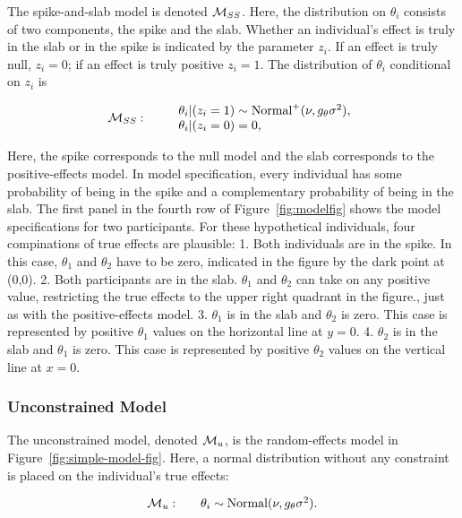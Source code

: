 \documentclass[english,man]{apa6}
\theoremstyle{definition}
\theoremstyle{definition}
\theoremstyle{remark}
\begin{document}
The spike-and-slab model is denoted \({\cal M}_{SS}\). Here, the
distribution on \(\theta_i\) consists of two components, the spike and
the slab. Whether an individual's effect is truly in the slab or in the
spike is indicated by the parameter \(z_i\). If an effect is truly null,
\(z_i = 0\); if an effect is truly positive \(z_i = 1\). The
distribution of \(\theta_i\) conditional on \(z_i\) is

\begin{align*}
{\cal M}_{SS}:
\qquad
\begin{array}{l}
\theta_i | (z_i = 1) \sim \mbox{Normal}^+(\nu, g_\theta \sigma^2),\\
\theta_i | (z_i = 0) = 0,
\end{array}
\end{align*}

Here, the spike corresponds to the null model and the slab corresponds
to the positive-effects model. In model specification, every individual
has some probability of being in the spike and a complementary
probability of being in the slab. The first panel in the fourth row of
Figure~\ref{fig:modelfig} shows the model specifications for two
participants. For these hypothetical individuals, four compinations of
true effects are plausible: 1. Both individuals are in the spike. In
this case, \(\theta_1\) and \(\theta_2\) have to be zero, indicated in
the figure by the dark point at (0,0). 2. Both participants are in the
slab. \(\theta_1\) and \(\theta_2\) can take on any positive value,
restricting the true effects to the upper right quadrant in the figure.,
just as with the positive-effects model. 3. \(\theta_1\) is in the slab
and \(\theta_2\) is zero. This case is represented by positive
\(\theta_1\) values on the horizontal line at \(y = 0\). 4. \(\theta_2\)
is in the slab and \(\theta_1\) is zero. This case is represented by
positive \(\theta_2\) values on the vertical line at \(x = 0\).

\subsubsection{Unconstrained Model}\label{unconstrained-model}

The unconstrained model, denoted \({\cal M}_u\), is the random-effects
model in Figure~\ref{fig:simple-model-fig}. Here, a normal distribution
without any constraint is placed on the individual's true effects:

\[
  \begin{array}{llr}
{\cal M}_u: && \theta_i \sim \mbox{Normal}(\nu, g_\theta \sigma^2).\\
\end{array}
\]
\end{document}
